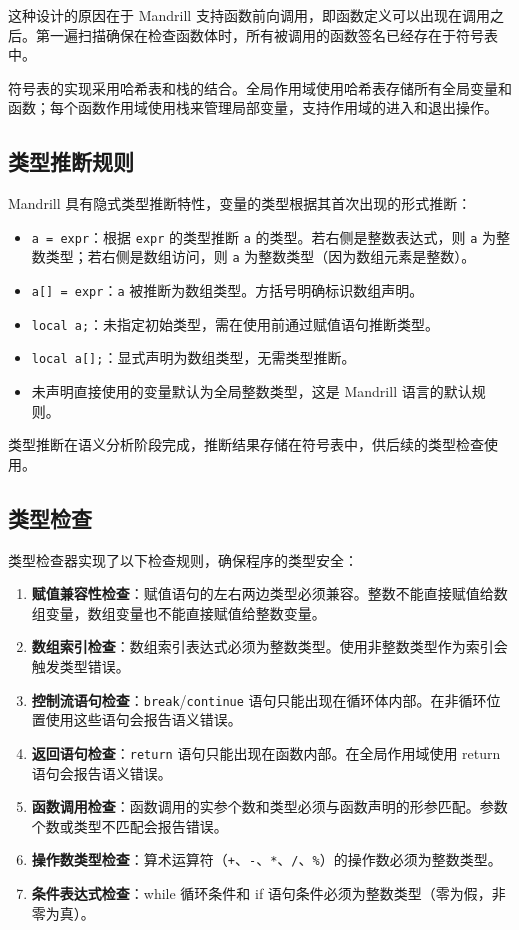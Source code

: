 \documentclass[12pt,hyperref,a4paper,UTF8]{ctexart}
\begin{document}
这种设计的原因在于 Mandrill 支持函数前向调用，即函数定义可以出现在调用之后。第一遍扫描确保在检查函数体时，所有被调用的函数签名已经存在于符号表中。

符号表的实现采用哈希表和栈的结合。全局作用域使用哈希表存储所有全局变量和函数；每个函数作用域使用栈来管理局部变量，支持作用域的进入和退出操作。

\subsection{类型推断规则}

Mandrill 具有隐式类型推断特性，变量的类型根据其首次出现的形式推断：

\begin{itemize}
    \item \texttt{a = expr}：根据 \texttt{expr} 的类型推断 \texttt{a} 的类型。若右侧是整数表达式，则 \texttt{a} 为整数类型；若右侧是数组访问，则 \texttt{a} 为整数类型（因为数组元素是整数）。
    \item \texttt{a[] = expr}：\texttt{a} 被推断为数组类型。方括号明确标识数组声明。
    \item \texttt{local a;}：未指定初始类型，需在使用前通过赋值语句推断类型。
    \item \texttt{local a[];}：显式声明为数组类型，无需类型推断。
    \item 未声明直接使用的变量默认为全局整数类型，这是 Mandrill 语言的默认规则。
\end{itemize}

类型推断在语义分析阶段完成，推断结果存储在符号表中，供后续的类型检查使用。

\subsection{类型检查}

类型检查器实现了以下检查规则，确保程序的类型安全：

\begin{enumerate}
    \item \textbf{赋值兼容性检查}：赋值语句的左右两边类型必须兼容。整数不能直接赋值给数组变量，数组变量也不能直接赋值给整数变量。
    \item \textbf{数组索引检查}：数组索引表达式必须为整数类型。使用非整数类型作为索引会触发类型错误。
    \item \textbf{控制流语句检查}：\texttt{break}/\texttt{continue} 语句只能出现在循环体内部。在非循环位置使用这些语句会报告语义错误。
    \item \textbf{返回语句检查}：\texttt{return} 语句只能出现在函数内部。在全局作用域使用 return 语句会报告语义错误。
    \item \textbf{函数调用检查}：函数调用的实参个数和类型必须与函数声明的形参匹配。参数个数或类型不匹配会报告错误。
    \item \textbf{操作数类型检查}：算术运算符（\texttt{+}、\texttt{-}、\texttt{*}、\texttt{/}、\texttt{\%}）的操作数必须为整数类型。
    \item \textbf{条件表达式检查}：while 循环条件和 if 语句条件必须为整数类型（零为假，非零为真）。
\end{enumerate}
\end{document}
